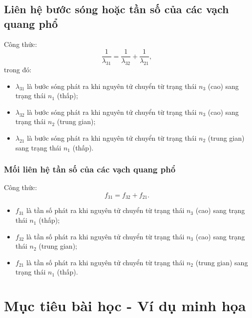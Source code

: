 \subsection{Liên hệ bước sóng hoặc tần số của các vạch quang phổ}

	Công thức:
	\begin{equation}
		\dfrac{1}{\lambda_{31}} = \dfrac{1}{\lambda_{32}}+ \dfrac{1}{\lambda_{21}},
	\end{equation}
trong đó:
\begin{itemize}
	\item $\lambda_{31}$ là bước sóng phát ra khi nguyên tử chuyển từ trạng thái $n_3$ (cao) sang trạng thái $n _1$ (thấp);
	\item $\lambda_{32}$ là bước sóng phát ra khi nguyên tử chuyển từ trạng thái $n_3$ (cao) sang trạng thái $n _2$ (trung gian);
	\item $\lambda_{21}$ là bước sóng phát ra khi nguyên tử chuyển từ trạng thái $n_2$ (trung gian) sang trạng thái $n _1$ (thấp).
\end{itemize}
\subsubsection{Mối liên hệ tần số của các vạch quang phổ}
	Công thức:
	\begin{equation}
	f_{31} = f_{32}+ f_{21}.
	\end{equation}
\begin{itemize}
	\item $f_{31}$ là tần số phát ra khi nguyên tử chuyển từ trạng thái $n_3$ (cao) sang trạng thái $n _1$ (thấp);
	\item $f_{32}$ là tần số phát ra khi nguyên tử chuyển từ trạng thái $n_3$ (cao) sang trạng thái $n _2$ (trung gian);
	\item $f_{21}$ là tần số phát ra khi nguyên tử chuyển từ trạng thái $n_2$ (trung gian) sang trạng thái $n _1$ (thấp).
\end{itemize}

\section{Mục tiêu bài học - Ví dụ minh họa}

